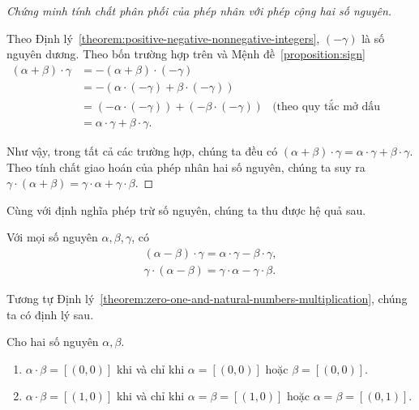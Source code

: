 \begin{proof}[Chứng minh tính chất phân phối của phép nhân với phép cộng hai số nguyên]
\begin{enumerate}[label={\textbf{Trường hợp \arabic*.}},itemindent=1.7cm]
		      Theo Định lý~\ref{theorem:positive-negative-nonnegative-integers}, $(-\gamma)$ là số nguyên dương. Theo bốn trường hợp trên và Mệnh đề~\ref{proposition:sign}
		      \begin{align*}
			      (\alpha + \beta)\cdot\gamma & = -(\alpha+\beta)\cdot(-\gamma)                                                         \\
			                                  & = -(\alpha\cdot(-\gamma) + \beta\cdot(-\gamma))                                         \\
			                                  & = (-\alpha\cdot(-\gamma)) + (-\beta\cdot(-\gamma)) & \text{(theo quy tắc mở dấu ngoặc)} \\
			                                  & = \alpha\cdot\gamma + \beta\cdot\gamma.
		      \end{align*}
	\end{enumerate}

	Như vậy, trong tất cả các trường hợp, chúng ta đều có $(\alpha + \beta)\cdot\gamma = \alpha\cdot\gamma + \beta\cdot\gamma$. Theo tính chất giao hoán của phép nhân hai số nguyên, chúng ta suy ra $\gamma\cdot(\alpha+\beta) = \gamma\cdot\alpha + \gamma\cdot\beta$.
\end{proof}

Cùng với định nghĩa phép trừ số nguyên, chúng ta thu được hệ quả sau.
\begin{corollary}
	Với mọi số nguyên $\alpha, \beta, \gamma$, có
	\[
		\begin{split}
			(\alpha - \beta)\cdot\gamma = \alpha\cdot\gamma - \beta\cdot\gamma, \\
			\gamma\cdot(\alpha - \beta) = \gamma\cdot\alpha - \gamma\cdot\beta.
		\end{split}
	\]
\end{corollary}

Tương tự Định lý~\ref{theorem:zero-one-and-natural-numbers-multiplication}, chúng ta có định lý sau.
\begin{theorem}\label{theorem:product-of-integers-are-zero-or-one}
	Cho hai số nguyên $\alpha, \beta$.
	\begin{enumerate}[label={(\roman*)}]
		\item $\alpha\cdot\beta = [(0,0)]$ khi và chỉ khi $\alpha = [(0,0)]$ hoặc $\beta = [(0,0)]$.
		\item $\alpha\cdot\beta = [(1,0)]$ khi và chỉ khi $\alpha = \beta = [(1, 0)]$ hoặc $\alpha = \beta = [(0,1)]$.
	\end{enumerate}
\end{theorem}

